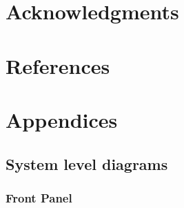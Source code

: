 \documentclass{article}
\begin{document}

\section{Acknowledgments}

  

\section{References}


\section{Appendices}


  \subsection{System level diagrams}

    \subsubsection{Front Panel}
      
\end{document}
